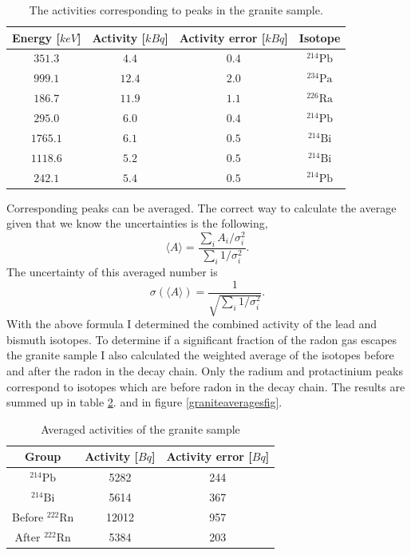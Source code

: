 \documentclass[pdftex,12pt,a4paper]{article}
\begin{document}
		\begin{table}[H]
		\centering
		\begin{tabular}{|c|c|c|c|}
			\hline
			Energy [$keV$] & Activity [$kBq$]& Activity error [$kBq$]& Isotope \\
			\hline
                        $351.3$ & $4.4$ & $0.4$ & $^{214}\text{Pb}$ \\
            $999.1$ & $12.4$ & $2.0$ & $^{234}\text{Pa}$ \\
            $186.7$ & $11.9$ & $1.1$ & $^{226}\text{Ra}$ \\
            $295.0$ & $6.0$ & $0.4$ & $^{214}\text{Pb}$ \\
            $1765.1$ & $6.1$ & $0.5$ & $^{214}\text{Bi}$ \\
            $1118.6$ & $5.2$ & $0.5$ & $^{214}\text{Bi}$ \\
            $242.1$ & $5.4$ & $0.5$ & $^{214}\text{Pb}$ \\
			\hline
		\end{tabular}
		\caption{The activities corresponding to peaks in the granite sample.}
		 \label{granitepeaks}
		\end{table}
		Corresponding peaks can be averaged. The correct way to calculate the average given that we know the uncertainties is the following,
		\begin{equation}
			\langle A\rangle = \frac{\sum_i A_i / \sigma_i^2}{\sum_i 1 / \sigma_i^2}.
		\end{equation}
		The uncertainty of this averaged number is
		\begin{equation}
			\sigma(\langle A\rangle) = \frac{1}{\sqrt{\sum_i 1 / \sigma_i^2}}.
		\end{equation}
		With the above formula I determined the combined activity of the lead and bismuth isotopes. To determine if a significant fraction of the radon gas escapes the granite sample I also calculated the weighted average of the isotopes before and after the radon in the decay chain. Only the radium and protactinium peaks correspond to isotopes which are before radon in the decay chain. The results are summed up in table \ref{graniteaverages}. and in figure \ref{graniteaveragesfig}.
		\begin{table}[H]
		\centering
		\begin{tabular}{|c|c|c|}
			\hline
			Group & Activity [$Bq$] & Activity error [$Bq$] \\
			\hline
            $^{214}\text{Pb}$ & 5282 & 244 \\
            $^{214}\text{Bi}$ & 5614 & 367 \\
            Before $^{222}\text{Rn}$ & 12012 & 957 \\
            After $^{222}\text{Rn}$ & 5384 & 203 \\
            \hline
		\end{tabular}
		\caption{Averaged activities of the granite sample}
		\label{graniteaverages}
		\end{table}
\end{document}
